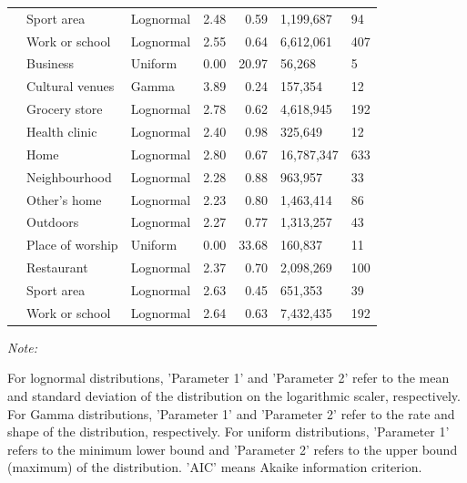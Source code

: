 \documentclass[preprint, 3p,
authoryear]{elsarticle} %
\begin{document}
\begin{table}
{\begin{threeparttable}
\begin{tabular}[t]{rllrrll}
 & Sport area & Lognormal & 2.48 & 0.59 & 1,199,687 & 94\\

\multirow[t]{-12}{*}{\raggedleft\arraybackslash 2015} & Work or school & Lognormal & 2.55 & 0.64 & 6,612,061 & 407\\
\cmidrule{1-7}
 & Business & Uniform & 0.00 & 20.97 & 56,268 & 5\\

 & Cultural venues & Gamma & 3.89 & 0.24 & 157,354 & 12\\

 & Grocery store & Lognormal & 2.78 & 0.62 & 4,618,945 & 192\\

 & Health clinic & Lognormal & 2.40 & 0.98 & 325,649 & 12\\

 & Home & Lognormal & 2.80 & 0.67 & 16,787,347 & 633\\

 & Neighbourhood & Lognormal & 2.28 & 0.88 & 963,957 & 33\\

 & Other's home & Lognormal & 2.23 & 0.80 & 1,463,414 & 86\\

 & Outdoors & Lognormal & 2.27 & 0.77 & 1,313,257 & 43\\

 & Place of worship & Uniform & 0.00 & 33.68 & 160,837 & 11\\

 & Restaurant & Lognormal & 2.37 & 0.70 & 2,098,269 & 100\\

 & Sport area & Lognormal & 2.63 & 0.45 & 651,353 & 39\\

\multirow[t]{-12}{*}{\raggedleft\arraybackslash 2022} & Work or school & Lognormal & 2.64 & 0.63 & 7,432,435 & 192\\
\bottomrule
\end{tabular}
\begin{tablenotes}
\item \textit{Note: } 
\item For lognormal distributions, 'Parameter 1' and 'Parameter 2' refer to the mean and standard deviation of the distribution on the logarithmic scaler, respectively. For Gamma distributions, 'Parameter 1' and 'Parameter 2' refer to the rate and shape of the distribution, respectively. For uniform distributions,  'Parameter 1' refers to the minimum lower bound and 'Parameter 2'  refers to the upper bound (maximum) of the distribution.  'AIC' means Akaike information criterion.
\end{tablenotes}
\end{threeparttable}}
\end{table}
\end{document}
